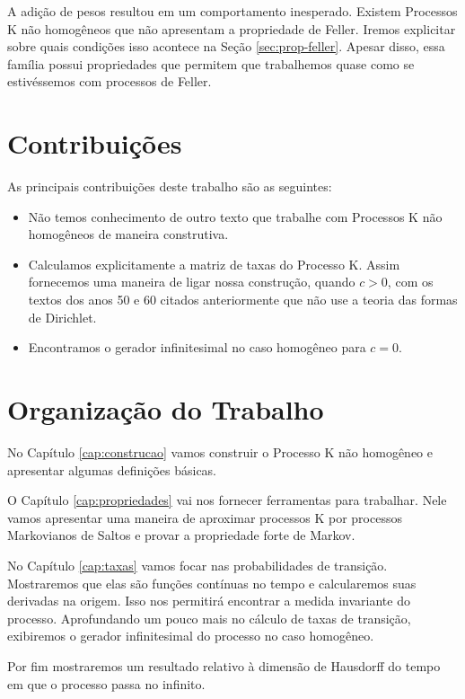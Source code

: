 A adição de pesos resultou em um comportamento inesperado. Existem
Processos K não homogêneos que não apresentam a propriedade de Feller.
Iremos explicitar sobre quais condições isso acontece na Seção
\ref{sec:prop-feller}.  Apesar disso, essa família possui propriedades
que permitem que trabalhemos quase como se estivéssemos com processos
de Feller.

\section{Contribuições}
\label{sec:contribucoes}

As principais contribuições deste trabalho são as seguintes:

\begin{itemize}

\item Não temos conhecimento de outro texto que trabalhe com Processos
  K não homogêneos de maneira construtiva.

\item Calculamos explicitamente a matriz de taxas do Processo K. Assim
  fornecemos uma maneira de ligar nossa construção, quando $c > 0$, com
  os textos dos anos 50 e 60 citados anteriormente que não use a
  teoria das formas de Dirichlet.

\item Encontramos o gerador infinitesimal no caso homogêneo para $c =
  0$.

\end{itemize}

\section{Organização do Trabalho}
\label{sec:organizacao_trabalho}

No Capítulo \ref{cap:construcao} vamos construir o Processo K não
homogêneo e apresentar algumas definições básicas.

O Capítulo \ref{cap:propriedades} vai nos fornecer ferramentas para
trabalhar. Nele vamos apresentar uma maneira de aproximar processos K por
processos Markovianos de Saltos e provar a propriedade forte de
Markov.

No Capítulo \ref{cap:taxas} vamos focar nas probabilidades de
transição. Mostraremos que elas são funções contínuas no tempo e
calcularemos suas derivadas na origem. Isso nos permitirá encontrar a
medida invariante do processo.  Aprofundando um pouco mais no cálculo
de taxas de transição, exibiremos o gerador infinitesimal do processo
no caso homogêneo.

Por fim mostraremos um resultado relativo à dimensão de Hausdorff do
tempo em que o processo passa no infinito.


